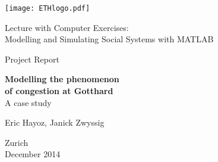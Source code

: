 
\thispagestyle{empty}

\begin{center}
\texttt{[image: ETHlogo.pdf]}

\bigskip


\bigskip


\bigskip


\LARGE{ 	Lecture with Computer Exercises:\\ }
\LARGE{ Modelling and Simulating Social Systems with MATLAB\\}

\bigskip

\bigskip

\small{Project Report}\\

\bigskip

\bigskip

\bigskip

\bigskip

\bigskip

\begin{center}
\textbf{\huge{Modelling the phenomenon}}\\ \vspace{.2cm}
\textbf{\huge{of congestion at Gotthard}}\\\vspace{.2cm}
\LARGE{A case study}\\
\end{center}
\bigskip

\bigskip

\vspace{1cm}

\Large{Eric Hayoz, Janick Zwyssig}



\bigskip

\bigskip

\bigskip

\bigskip

\bigskip

\bigskip

\bigskip
\vspace{3cm}

Zurich\\
December 2014\\

\end{center}


